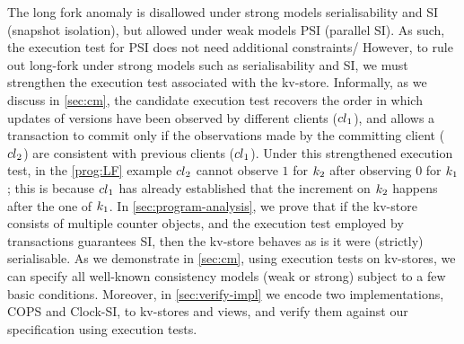 The long fork anomaly is disallowed under strong models \eg serialisability and SI (snapshot isolation), 
but allowed under weak models \eg PSI (parallel SI). 
As such, the execution test for PSI does not need additional constraints/ 
However, to rule out long-fork under strong models such as serialisability and SI, 
we must strengthen the execution test associated with the kv-store.
Informally, as we discuss in \cref{sec:cm}, the candidate execution test recovers the order in which 
updates of versions have been observed by different clients (\eg ${cl}_1$), 
and allows a transaction to commit only if the observations made by the committing client (\eg ${cl}_2$) 
are consistent with previous clients (\ie ${cl}_1$). 
Under this strengthened execution test, in the \eqref{prog:LF} example ${cl}_2$ cannot
observe $1$ for $k_2$ after observing $0$ for $k_1$; 
this is because ${cl}_1$ has already established that the increment on $k_2$ happens after 
the one of $k_1$. 
In \cref{sec:program-analysis}, we prove that if the kv-store consists of multiple counter objects, and the execution test employed by transactions guarantees SI, then the kv-store 
behaves as is it were (strictly) serialisable.
%
As we demonstrate in \cref{sec:cm}, using execution tests on kv-stores, we can specify all well-known consistency models (weak or strong) subject to a few basic conditions. 
%
Moreover, in \cref{sec:verify-impl} we encode two implementations, COPS and Clock-SI, to kv-stores and views,
and verify them against our specification using execution tests.
